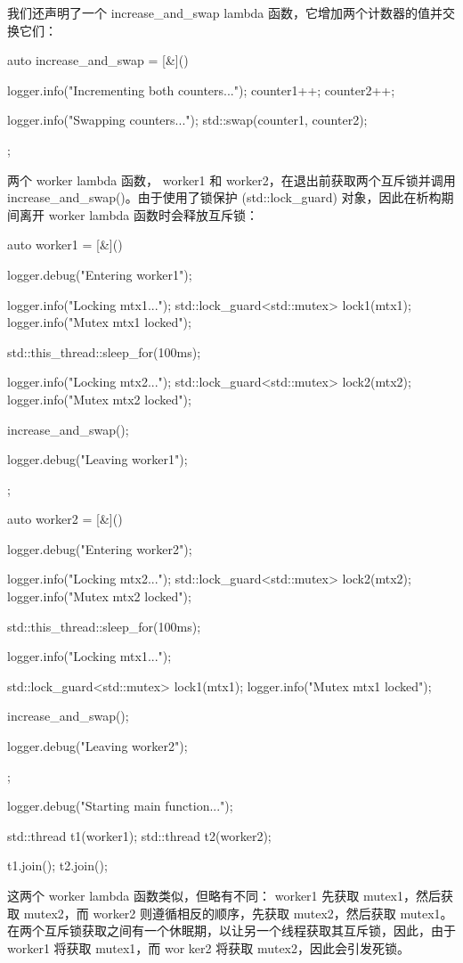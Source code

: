 我们还声明了一个 increase\_and\_swap lambda 函数，它增加两个计数器的值并交换它们：

\begin{cpp}
auto increase_and_swap = [&]() {
    logger.info("Incrementing both counters...");
    counter1++;
    counter2++;

    logger.info("Swapping counters...");
    std::swap(counter1, counter2);
};
\end{cpp}

两个 worker lambda 函数， worker1 和 worker2，在退出前获取两个互斥锁并调用 increase\_and\_swap()。由于使用了锁保护 (std::lock\_guard) 对象，因此在析构期间离开 worker lambda 函数时会释放互斥锁：

\begin{cpp}
auto worker1 = [&]() {
    logger.debug("Entering worker1");

    logger.info("Locking mtx1...");
    std::lock_guard<std::mutex> lock1(mtx1);
    logger.info("Mutex mtx1 locked");

    std::this_thread::sleep_for(100ms);

    logger.info("Locking mtx2...");
    std::lock_guard<std::mutex> lock2(mtx2);
    logger.info("Mutex mtx2 locked");

    increase_and_swap();

    logger.debug("Leaving worker1");
};

auto worker2 = [&]() {
    logger.debug("Entering worker2");

    logger.info("Locking mtx2...");
    std::lock_guard<std::mutex> lock2(mtx2);
    logger.info("Mutex mtx2 locked");

    std::this_thread::sleep_for(100ms);

    logger.info("Locking mtx1...");

    std::lock_guard<std::mutex> lock1(mtx1);
    logger.info("Mutex mtx1 locked");

    increase_and_swap();

    logger.debug("Leaving worker2");
};

logger.debug("Starting main function...");

std::thread t1(worker1);
std::thread t2(worker2);

t1.join();
t2.join();
\end{cpp}

这两个 worker lambda 函数类似，但略有不同： worker1 先获取 mutex1，然后获取 mutex2，而 worker2 则遵循相反的顺序，先获取 mutex2，然后获取 mutex1。在两个互斥锁获取之间有一个休眠期，以让另一个线程获取其互斥锁，因此，由于 worker1 将获取 mutex1，而 wor ker2 将获取 mutex2，因此会引发死锁。

